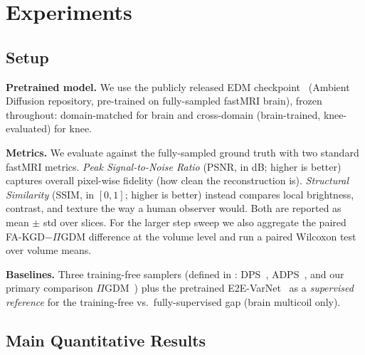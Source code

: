 \documentclass[10pt,twocolumn,letterpaper]{article}
\begin{document}
\section{Experiments}
\label{sec:experiments}

\subsection{Setup}

\textbf{Pretrained model.} We use the publicly released EDM
checkpoint~\cite{daras2025ambient} (Ambient Diffusion repository, pre-trained
on fully-sampled fastMRI brain), frozen throughout: domain-matched for brain
and cross-domain (brain-trained, knee-evaluated) for knee.

\textbf{Metrics.} We evaluate against the fully-sampled ground truth with two
standard fastMRI metrics. \emph{Peak Signal-to-Noise Ratio} (PSNR, in dB;
higher is better) captures overall pixel-wise fidelity (how clean
the reconstruction is). \emph{Structural Similarity} (SSIM, in $[0,1]$; higher is better)
instead compares local brightness, contrast, and texture the way a human
observer would. Both are reported as
mean $\pm$ std over slices. For the larger step sweep we also aggregate the
paired FA-KGD$-\Pi$GDM difference at the volume level and run a paired Wilcoxon
test over volume means.

\textbf{Baselines.} Three training-free samplers (defined in
: DPS~\cite{chung2023dps}, ADPS~\cite{daras2025ambient},
and our primary comparison $\Pi$GDM~\cite{song2023pigdm}) plus the pretrained
E2E-VarNet~\cite{sriram2020varnet} as a \emph{supervised reference} for the
training-free vs.\ fully-supervised gap (brain multicoil only).
\subsection{Main Quantitative Results}
\end{document}
